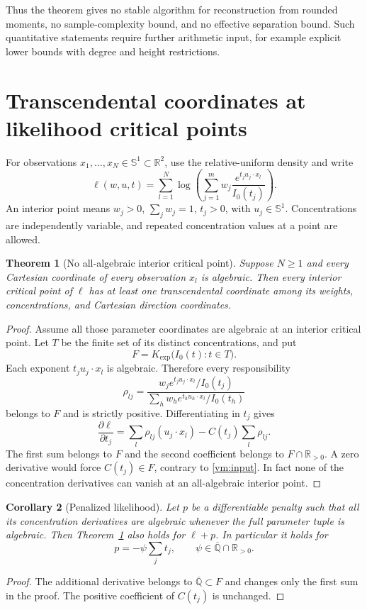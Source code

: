 \documentclass[11pt]{article}
\newtheorem{theorem}{Theorem}[section]
\newtheorem{corollary}[theorem]{Corollary}
\theoremstyle{definition}
\theoremstyle{remark}
\newcommand{\kk}{\overline{\mathbb Q}}
\newcommand{\Kexp}{K_{\mathrm{exp}}}
\newcommand{\Sone}{\mathbb S^1}
\begin{document}
Thus the theorem gives no stable algorithm for reconstruction from
rounded moments, no sample-complexity bound, and no effective separation
bound.  Such quantitative statements require further arithmetic input,
for example explicit lower bounds with degree and height restrictions.

\section{Transcendental coordinates at likelihood critical points}

For observations $x_1,\ldots,x_N\in\Sone\subset\mathbb R^2$, use
the relative-uniform density and write
\[
 \ell(w,u,t)=\sum_{l=1}^N
 \log\left(\sum_{j=1}^m
     w_j\frac{e^{t_j u_j\cdot x_l}}{I_0(t_j)}\right).
\]
An interior point means $w_j>0$, $\sum_jw_j=1$, $t_j>0$, with
$u_j\in\Sone$.  Concentrations are independently variable, and repeated
concentration values at a point are allowed.

\begin{theorem}[No all-algebraic interior critical point]
\label{vm:critical}
Suppose $N\geq1$ and every Cartesian coordinate of every observation
$x_l$ is algebraic.  Then every interior critical point of $\ell$ has
at least one transcendental coordinate among its weights,
concentrations, and Cartesian direction coordinates.
\end{theorem}
\begin{proof}
Assume all those parameter coordinates are algebraic at an interior
critical point.  Let $T$ be the finite set of its distinct concentrations,
and put
\[
 F=\Kexp\bigl(I_0(t):t\in T\bigr).
\]
Each exponent $t_j u_j\cdot x_l$ is algebraic.  Therefore every
responsibility
\[
 \rho_{lj}=
 \frac{w_j e^{t_j u_j\cdot x_l}/I_0(t_j)}
 {\sum_h w_h e^{t_h u_h\cdot x_l}/I_0(t_h)}
\]
belongs to $F$ and is strictly positive.  Differentiating in $t_j$
gives
\[
 \frac{\partial\ell}{\partial t_j}
 =\sum_l\rho_{lj}(u_j\cdot x_l)
       -C(t_j)\sum_l\rho_{lj}.
\]
The first sum belongs to $F$ and the second coefficient belongs to
$F\cap\mathbb R_{>0}$.  A zero derivative would force $C(t_j)\in F$,
contrary to \eqref{vm:input}.  In fact none of the concentration
derivatives can vanish at an all-algebraic interior point.
\end{proof}

\begin{corollary}[Penalized likelihood]\label{vm:penalty}
Let $p$ be a differentiable penalty such that all its concentration
derivatives are algebraic whenever the full parameter tuple is
algebraic.  Then Theorem~\ref{vm:critical} also holds for $\ell+p$.
In particular it holds for
\[
 p=-\psi\sum_j t_j,\qquad \psi\in\kk\cap\mathbb R_{>0}.
\]
\end{corollary}
\begin{proof}
The additional derivative belongs to $\kk\subset F$ and changes only
the first sum in the proof.  The positive coefficient of $C(t_j)$
is unchanged.
\end{proof}
\end{document}

